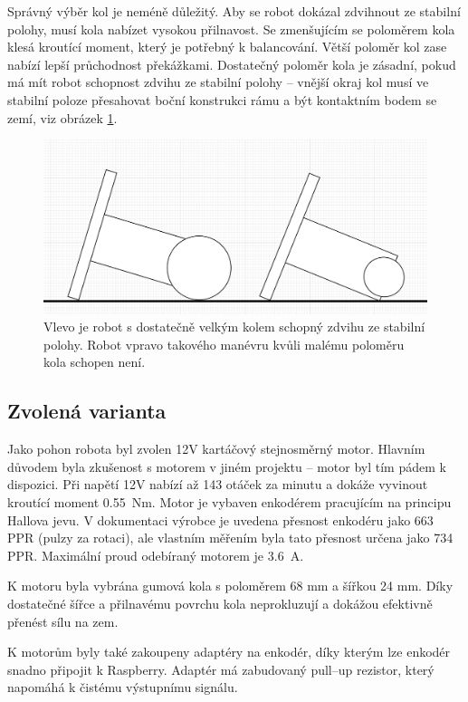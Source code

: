 Správný výběr kol je neméně důležitý. Aby se robot dokázal zdvihnout ze stabilní polohy, musí kola nabízet vysokou přilnavost. Se zmenšujícím se poloměrem kola klesá kroutící moment, který je potřebný k balancování. Větší poloměr kol zase nabízí lepší průchodnost překážkami. Dostatečný poloměr kola je zásadní, pokud má mít robot schopnost zdvihu ze stabilní polohy -- vnější okraj kol musí ve stabilní poloze přesahovat boční konstrukci rámu a být kontaktním bodem se zemí, viz obrázek \ref{wheel_size}.

\begin{figure}[H]
    \centering
    \includegraphics[width=1\linewidth]{obrazky-figures/wheel_size.png}
    \caption {Vlevo je robot s dostatečně velkým kolem schopný zdvihu ze stabilní polohy. Robot vpravo takového manévru kvůli malému poloměru kola schopen není. }
    \label{wheel_size}
\end{figure}

\subsection*{Zvolená varianta}
Jako pohon robota byl zvolen 12V kartáčový stejnosměrný motor. Hlavním důvodem byla zkušenost s motorem v jiném projektu -- motor byl tím pádem k dispozici. Při napětí 12V nabízí až 143 otáček za minutu a dokáže vyvinout kroutící moment 0.55~Nm. Motor je vybaven enkodérem pracujícím na principu Hallova jevu. V dokumentaci výrobce je uvedena přesnost enkodéru jako 663 PPR (pulzy za rotaci), ale vlastním měřením byla tato přesnost určena jako 734 PPR. Maximální proud odebíraný motorem je 3.6~A.

K motoru byla vybrána gumová kola s poloměrem 68 mm a šířkou 24 mm. Díky dostatečné šířce a přilnavému povrchu kola neprokluzují a dokážou efektivně přenést sílu na zem.

K motorům byly také zakoupeny adaptéry na enkodér, díky kterým lze enkodér snadno připojit k Raspberry. Adaptér má zabudovaný pull--up rezistor, který napomáhá k čistému výstupnímu signálu.

